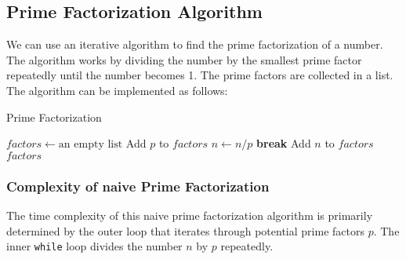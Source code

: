 \documentclass[oneside]{book}
\begin{document}
\subsection{Prime Factorization Algorithm}
We can use an iterative algorithm to find the prime factorization of a number. The algorithm works by dividing the number by the smallest prime factor repeatedly until the number becomes 1. The prime factors are collected in a list.
The algorithm can be implemented as follows:
\begin{algorithm}
	\caption{Prime Factorization}
	\begin{algorithmic}[H]
		\State $factors \gets \text{an empty list}$
		 
		\State Add $p$ to $factors$
		\State $n \gets n / p$
		\EndWhile
		\State \textbf{break}
		\EndIf
		\EndFor
		\State Add $n$ to $factors$
		\EndIf
		\State \Return $factors$
		\EndFunction
	\end{algorithmic}
\end{algorithm}

\subsubsection{Complexity of naive Prime Factorization}
The time complexity of this naive prime factorization algorithm is primarily determined by the outer loop that iterates through potential prime factors $p$. The inner \texttt{while} loop divides the number $n$ by $p$ repeatedly.
\end{document}
